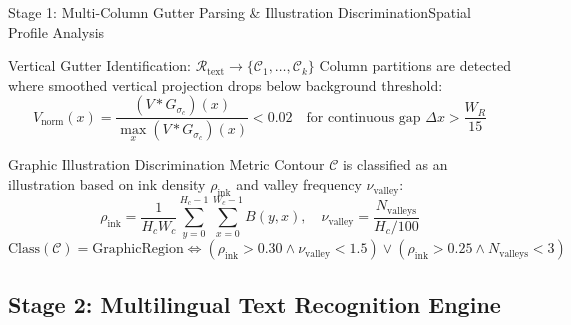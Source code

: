 \documentclass[
  aspectratio=169,
]{beamer}
\begin{document}
\begin{frame}{Stage 1: Multi-Column Gutter Parsing \& Illustration Discrimination}{Spatial Profile Analysis}
\begin{block}{Vertical Gutter Identification: $\mathcal{R}_{\text{text}} \rightarrow \{\mathcal{C}_1, \dots, \mathcal{C}_k\}$}
Column partitions are detected where smoothed vertical projection drops below background threshold:
\[
  V_{\text{norm}}(x) = \frac{(V * G_{\sigma_c})(x)}{\max_x (V * G_{\sigma_c})(x)} < 0.02 \quad \text{for continuous gap } \Delta x > \frac{W_R}{15}
\]
\end{block}
\begin{block}{Graphic Illustration Discrimination Metric}
Contour $\mathcal{C}$ is classified as an illustration based on ink density $\rho_{\text{ink}}$ and valley frequency $\nu_{\text{valley}}$:
\[
  \rho_{\text{ink}} = \frac{1}{H_c W_c} \sum_{y=0}^{H_c-1} \sum_{x=0}^{W_c-1} B(y,x), \quad \nu_{\text{valley}} = \frac{N_{\text{valleys}}}{H_c / 100}
\]
\[
  \text{Class}(\mathcal{C}) = \text{GraphicRegion} \iff (\rho_{\text{ink}} > 0.30 \land \nu_{\text{valley}} < 1.5) \lor (\rho_{\text{ink}} > 0.25 \land N_{\text{valleys}} < 3)
\]
\end{block}
\end{frame}

\subsection{Stage 2: Multilingual Text Recognition Engine}
\end{document}
